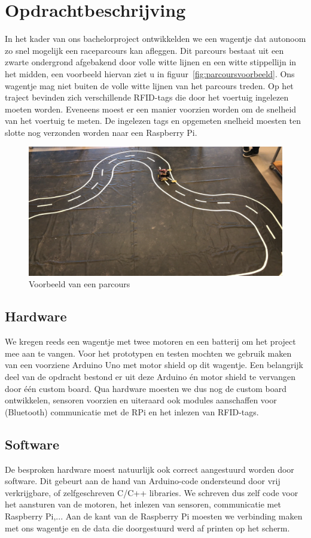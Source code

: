 \section{Opdrachtbeschrijving}
In het kader van ons bachelorproject ontwikkelden we een wagentje dat autonoom zo snel mogelijk een raceparcours kan afleggen. Dit parcours bestaat uit een zwarte ondergrond afgebakend door volle witte lijnen en een witte stippellijn in het midden, een voorbeeld hiervan ziet u in figuur~\vref{fig:parcoursvoorbeeld}. Ons wagentje mag niet buiten de volle witte lijnen van het parcours treden. Op het traject bevinden zich verschillende RFID-tags die door het voertuig ingelezen moeten worden. Eveneens moest er een manier voorzien worden om de snelheid van het voertuig te meten. De ingelezen tags en opgemeten snelheid moesten ten slotte nog verzonden worden naar een Raspberry Pi.\\
\begin{figure}[H]
	\centering
	\includegraphics[width=\textwidth]{parcoursvoorbeeld.png}
	\caption{Voorbeeld van een parcours}
	\label{fig:parcoursvoorbeeld}
\end{figure}
\subsection{Hardware}
We kregen reeds een wagentje met twee motoren en een batterij om het project mee aan te vangen.
Voor het prototypen en testen mochten we gebruik maken van een voorziene Arduino Uno met motor shield op dit wagentje. Een belangrijk deel van de opdracht bestond er uit deze Arduino \'en motor shield te vervangen door \'e\'en custom board.
Qua hardware moesten we dus nog de custom board ontwikkelen, sensoren voorzien en uiteraard ook modules aanschaffen voor (Bluetooth) communicatie met de RPi en het inlezen van RFID-tags.\\
\subsection{Software}
De besproken hardware moest natuurlijk ook correct aangestuurd worden door software. Dit gebeurt aan de hand van Arduino-code ondersteund door vrij verkrijgbare, of zelfgeschreven C/C++ libraries. We schreven dus zelf code voor het aansturen van de motoren, het inlezen van sensoren, communicatie met Raspberry Pi,...
Aan de kant van de Raspberry Pi moesten we verbinding maken met ons wagentje en de data die doorgestuurd werd af printen op het scherm.


